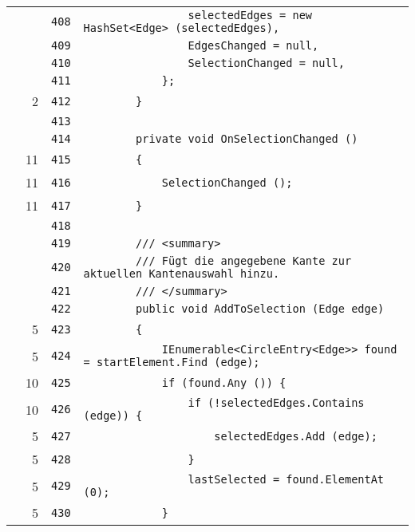 \documentclass[a4paper,10pt]{article}
\begin{document}
\begin{longtable}[l]{lrrl}
\cellcolor{gray} &  & \verb~408~ & \verb~                selectedEdges = new HashSet<Edge> (selectedEdges),~\\
\cellcolor{gray} &  & \verb~409~ & \verb~                EdgesChanged = null,~\\
\cellcolor{gray} &  & \verb~410~ & \verb~                SelectionChanged = null,~\\
\cellcolor{gray} &  & \verb~411~ & \verb~            };~\\
\cellcolor{green} & 2 & \verb~412~ & \verb~        }~\\
\cellcolor{gray} &  & \verb~413~ & \verb~~\\
\cellcolor{gray} &  & \verb~414~ & \verb~        private void OnSelectionChanged ()~\\
\cellcolor{green} & 11 & \verb~415~ & \verb~        {~\\
\cellcolor{green} & 11 & \verb~416~ & \verb~            SelectionChanged ();~\\
\cellcolor{green} & 11 & \verb~417~ & \verb~        }~\\
\cellcolor{gray} &  & \verb~418~ & \verb~~\\
\cellcolor{gray} &  & \verb~419~ & \verb~        /// <summary>~\\
\cellcolor{gray} &  & \verb~420~ & \verb~        /// Fügt die angegebene Kante zur aktuellen Kantenauswahl hinzu.~\\
\cellcolor{gray} &  & \verb~421~ & \verb~        /// </summary>~\\
\cellcolor{gray} &  & \verb~422~ & \verb~        public void AddToSelection (Edge edge)~\\
\cellcolor{green} & 5 & \verb~423~ & \verb~        {~\\
\cellcolor{green} & 5 & \verb~424~ & \verb~            IEnumerable<CircleEntry<Edge>> found = startElement.Find (edge);~\\
\cellcolor{green} & 10 & \verb~425~ & \verb~            if (found.Any ()) {~\\
\cellcolor{green} & 10 & \verb~426~ & \verb~                if (!selectedEdges.Contains (edge)) {~\\
\cellcolor{green} & 5 & \verb~427~ & \verb~                    selectedEdges.Add (edge);~\\
\cellcolor{green} & 5 & \verb~428~ & \verb~                }~\\
\cellcolor{green} & 5 & \verb~429~ & \verb~                lastSelected = found.ElementAt (0);~\\
\cellcolor{green} & 5 & \verb~430~ & \verb~            }~\\

\end{longtable}
\end{document}

